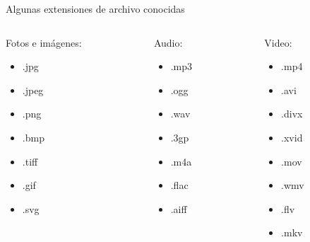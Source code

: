 
\begin{frame}{Algunas extensiones de archivo conocidas}
  \begin{columns}
    \begin{column}{0.33\textwidth}
      Fotos e imágenes:
      \begin{itemize}
        \item .jpg
        \item .jpeg
        \item .png
        \item .bmp
        \item .tiff
        \item .gif
        \item .svg
      \end{itemize}
    \end{column}
    \begin{column}{0.33\textwidth}
      Audio:
      \begin{itemize}
        \item .mp3
        \item .ogg
        \item .wav
        \item .3gp
        \item .m4a
        \item .flac
        \item .aiff
      \end{itemize}
    \end{column}
    \begin{column}{0.33\textwidth}
      Video:
      \begin{itemize}
        \item .mp4
        \item .avi
        \item .divx
        \item .xvid
        \item .mov
        \item .wmv
        \item .flv
        \item .mkv
      \end{itemize}
    \end{column}
  \end{columns}
\end{frame}


